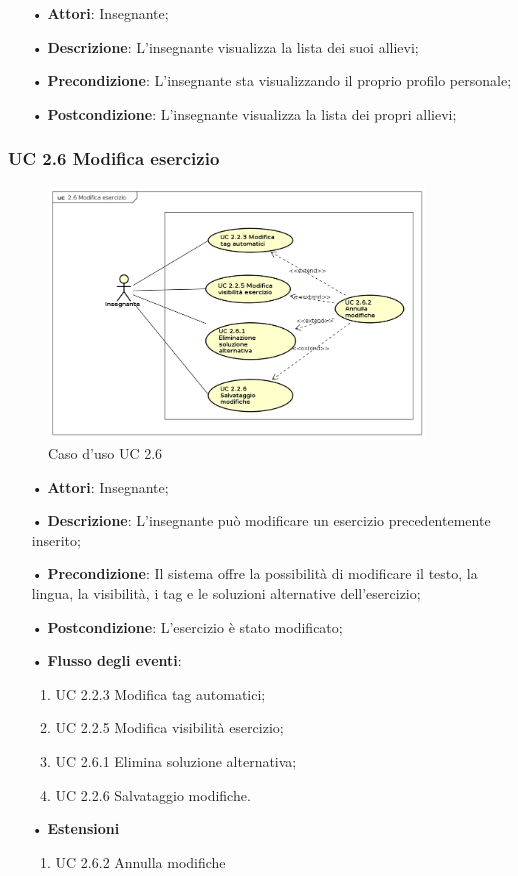 \begin{itemize}
	\item[•] \textbf{Attori}: Insegnante;
	\item[•] \textbf{Descrizione}: L’insegnante visualizza la lista dei suoi allievi;
	\item[•] \textbf{Precondizione}: L'insegnante sta visualizzando il proprio profilo personale;
	\item[•] \textbf{Postcondizione}: L’insegnante visualizza la lista dei propri allievi;
\end{itemize}



\subsubsection{UC 2.6 Modifica esercizio}
\begin{figure}[H]
\centering
\includegraphics[width=10cm]{img/UC26.png} 
\caption{Caso d'uso UC 2.6}
\end{figure}

\begin{itemize}
	\item[•] \textbf{Attori}: Insegnante;
	\item[•] \textbf{Descrizione}: L’insegnante può modificare un esercizio precedentemente inserito;
	\item[•] \textbf{Precondizione}: Il sistema offre la possibilità di modificare il testo, la
				lingua, la visibilità, i {tag} e le soluzioni alternative 
				dell’esercizio;
	\item[•] \textbf{Postcondizione}: L’esercizio è stato modificato;
	\item[•] \textbf{Flusso degli eventi}:
		\begin{enumerate}
			\item UC 2.2.3 Modifica {tag} automatici;
			\item UC 2.2.5 Modifica visibilità esercizio;
			\item UC 2.6.1 Elimina soluzione alternativa;
			\item UC 2.2.6 Salvataggio modifiche.
		\end{enumerate}
	\item[•] \textbf{Estensioni}
	\begin{enumerate}
		\item UC 2.6.2 Annulla modifiche 
	\end{enumerate}
\end{itemize}   

